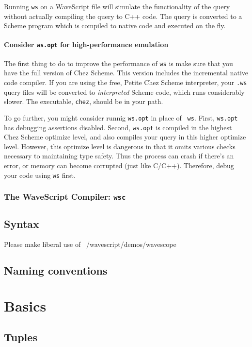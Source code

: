 Running {\tt ws} on a WaveScript file will simulate the functionality
of the query without actually compiling the query to C++ code.  The
query is converted to a Scheme program which is compiled to native
code and executed on the fly.  

\subsubsection*{Consider {\tt \bf ws.opt} for high-performance emulation}

The first thing to do to improve the performance of {\tt ws} is make
sure that you have the full version of Chez Scheme.  This version
includes the incremental native code compiler.  If you are using the
free, Petite Chez Scheme interpreter, your {\tt .ws} query files will
be converted to {\em interpreted} Scheme code, which runs considerably
slower.  The executable, {\tt chez}, should be in your path.

To go further, you might consider runnig {\tt ws.opt} in place of {\tt
ws}.  First, {\tt ws.opt} has debugging assertions disabled. 
Second, {\tt ws.opt} is compiled in the highest Chez Scheme optimize
level, and also compiles your query in this higher optimize level.
However, this optimize level is dangerous in that it omits various
checks necessary to maintaining type safety.  Thus the process can
crash if there's an error, or memory can become corrupted (just like
C/C++).  Therefore, debug your code using {\tt ws} first.

\subsection{The WaveScript Compiler: {\tt \bf wsc}}


\section{Syntax}

Please make liberal use of ~/wavescript/demos/wavescope

\section{Naming conventions}


\chapter{Basics}

\section{Tuples}

